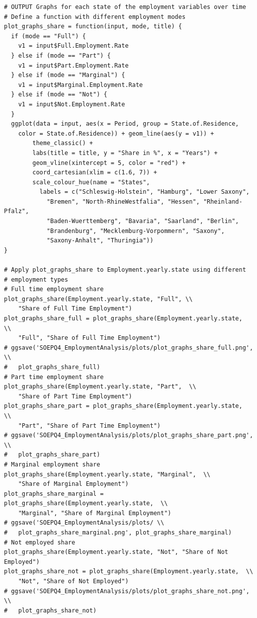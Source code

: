 \documentclass[a4paper]{article}
\begin{document}
{\begin{lstlisting}
# OUTPUT Graphs for each state of the employment variables over time 
# Define a function with different employment modes
plot_graphs_share = function(input, mode, title) {
  if (mode == "Full") {
    v1 = input$Full.Employment.Rate
  } else if (mode == "Part") {
    v1 = input$Part.Employment.Rate
  } else if (mode == "Marginal") {
    v1 = input$Marginal.Employment.Rate
  } else if (mode == "Not") {
    v1 = input$Not.Employment.Rate
  }
  ggplot(data = input, aes(x = Period, group = State.of.Residence, 
  	color = State.of.Residence)) + geom_line(aes(y = v1)) + 
    	theme_classic() + 
        labs(title = title, y = "Share in %", x = "Years") + 
        geom_vline(xintercept = 5, color = "red") + 
        coord_cartesian(xlim = c(1.6, 7)) +
        scale_colour_hue(name = "States", 
          labels = c("Schleswig-Holstein", "Hamburg", "Lower Saxony", 
            "Bremen", "North-RhineWestfalia", "Hessen", "Rheinland-Pfalz", 
            "Baden-Wuerttemberg", "Bavaria", "Saarland", "Berlin", 
            "Brandenburg", "Mecklemburg-Vorpommern", "Saxony", 
            "Saxony-Anhalt", "Thuringia"))
}

# Apply plot_graphs_share to Employment.yearly.state using different 
# employment types
# Full time employment share
plot_graphs_share(Employment.yearly.state, "Full", \\
	"Share of Full Time Employment")
plot_graphs_share_full = plot_graphs_share(Employment.yearly.state,  \\
	"Full", "Share of Full Time Employment")
# ggsave('SOEPQ4_EmploymentAnalysis/plots/plot_graphs_share_full.png',  \\
#	plot_graphs_share_full) 
# Part time employment share
plot_graphs_share(Employment.yearly.state, "Part",  \\
	"Share of Part Time Employment")
plot_graphs_share_part = plot_graphs_share(Employment.yearly.state,  \\
	"Part", "Share of Part Time Employment")
# ggsave('SOEPQ4_EmploymentAnalysis/plots/plot_graphs_share_part.png',  \\
#	plot_graphs_share_part) 
# Marginal employment share
plot_graphs_share(Employment.yearly.state, "Marginal",  \\
	"Share of Marginal Employment")
plot_graphs_share_marginal = plot_graphs_share(Employment.yearly.state,  \\
	"Marginal", "Share of Marginal Employment")
# ggsave('SOEPQ4_EmploymentAnalysis/plots/ \\
#	plot_graphs_share_marginal.png', plot_graphs_share_marginal) 
# Not employed share
plot_graphs_share(Employment.yearly.state, "Not", "Share of Not Employed")
plot_graphs_share_not = plot_graphs_share(Employment.yearly.state,  \\
	"Not", "Share of Not Employed")
# ggsave('SOEPQ4_EmploymentAnalysis/plots/plot_graphs_share_not.png',  \\
#	plot_graphs_share_not)
\end{lstlisting}
\newpage
}
\end{document}
